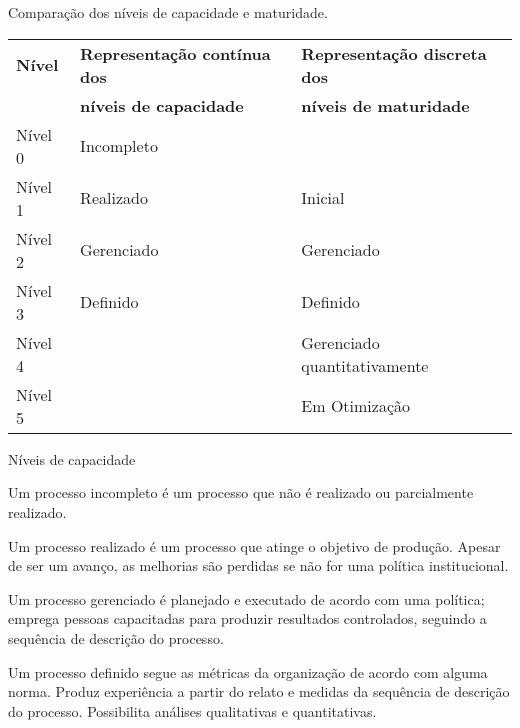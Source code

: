 
\section{\insertlecture}

\onlytitleframe{\insertlecture}

\begin{frame}{\insertlecture}
\footnotesize
Comparação dos níveis de capacidade e maturidade.\\\bigskip
\begin{tabular}{l|l|l}\hline
\bf Nível &\bf Representação contínua dos  &\bf Representação discreta dos  \\
& \bf níveis de capacidade & \bf níveis de maturidade\\ \hline\hline
Nível 0 & Incompleto & \\\hline
Nível 1 & Realizado & Inicial \\\hline
Nível 2 & Gerenciado & Gerenciado \\\hline
Nível 3 & Definido & Definido \\\hline
Nível 4 & & Gerenciado quantitativamente \\\hline
Nível 5 & & Em Otimização \\\hline
\end{tabular}
\end{frame}

\begin{frame}{Níveis de capacidade}\small
\begin{description}[<+->]
\item[0. Incompleto:] Um  processo incompleto é um processo que
  não é realizado ou parcialmente realizado.
\item[1. Realizado:] Um processo realizado é um processo que atinge o
  objetivo de produção. Apesar de ser um avanço, as melhorias são
  perdidas se não for uma política institucional.
\item[2. Gerenciado:] Um processo gerenciado é planejado e executado
  de acordo com uma política; emprega pessoas capacitadas para
  produzir resultados controlados, seguindo a sequência de descrição
  do processo.
\item[3. Definido:] Um processo definido segue as métricas da
  organização de acordo com alguma norma. Produz experiência a partir
  do relato e medidas da sequência de descrição do
  processo. Possibilita análises qualitativas e quantitativas.
\end{description}
\end{frame}

